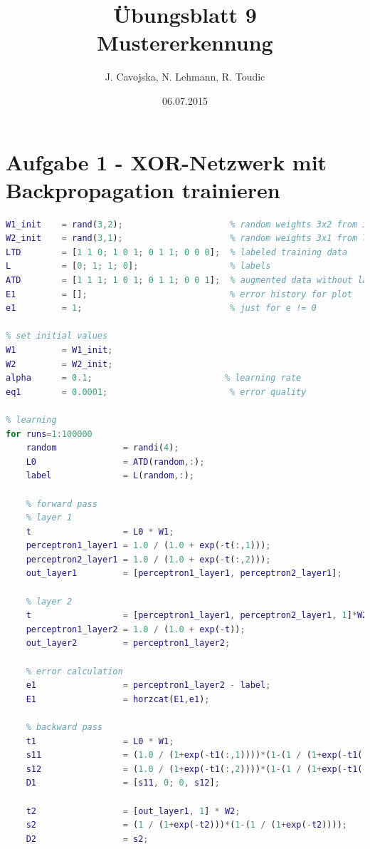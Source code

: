 \documentclass[12pt]{article}
\title{\"Ubungsblatt 9\\ \glqq Mustererkennung\grqq}
\author{J. Cavojska, N. Lehmann, R. Toudic}
\date{06.07.2015}
\begin{document}
\maketitle
\tableofcontents
\newpage

\section{Aufgabe 1 - XOR-Netzwerk mit Backpropagation trainieren}

\begin{lstlisting}[language=Matlab]
W1_init    = rand(3,2);                     % random weights 3x2 from input to layer 1
W2_init    = rand(3,1);                     % random weights 3x1 from layer 1 to layer 2
LTD        = [1 1 0; 1 0 1; 0 1 1; 0 0 0];  % labeled training data
L          = [0; 1; 1; 0];                  % labels
ATD        = [1 1 1; 1 0 1; 0 1 1; 0 0 1];  % augmented data without labels
E1         = [];                            % error history for plot
e1         = 1;                             % just for e != 0

% set initial values
W1         = W1_init;
W2         = W2_init;
alpha      = 0.1;                          % learning rate
eq1        = 0.0001;                        % error quality

% learning
for runs=1:100000
    random             = randi(4);
    L0                 = ATD(random,:);
    label              = L(random,:);
        
    % forward pass
    % layer 1
    t                  = L0 * W1;
    perceptron1_layer1 = 1.0 / (1.0 + exp(-t(:,1)));
    perceptron2_layer1 = 1.0 / (1.0 + exp(-t(:,2)));
    out_layer1         = [perceptron1_layer1, perceptron2_layer1];
    
    % layer 2
    t                  = [perceptron1_layer1, perceptron2_layer1, 1]*W2;
    perceptron1_layer2 = 1.0 / (1.0 + exp(-t));
    out_layer2         = perceptron1_layer2;
    
    % error calculation
    e1                 = perceptron1_layer2 - label;
    E1                 = horzcat(E1,e1);
    
    % backward pass
    t1                 = L0 * W1;
    s11                = (1.0 / (1+exp(-t1(:,1))))*(1-(1 / (1+exp(-t1(:,1)))));
    s12                = (1.0 / (1+exp(-t1(:,2))))*(1-(1 / (1+exp(-t1(:,2)))));
    D1                 = [s11, 0; 0, s12];
    
    t2                 = [out_layer1, 1] * W2;
    s2                 = (1 / (1+exp(-t2)))*(1-(1 / (1+exp(-t2))));
    D2                 = s2;
    

\end{lstlisting}
\end{document}
